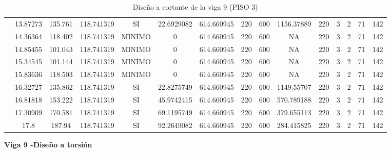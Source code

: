 \begin{table}[H]
{\begin{tabular}{|c|c|c|c|c|c|c|c|c|c|c|c|c|c|c|}
\cline{2-15}    & 13.87273 & 135.761 & 118.741319 & SI  & 22.6929082 & 614.660945 & 220 & 600 & 1156.37889 & 220 & 3   & 2   & 71  & 142 \bigstrut\\
\cline{2-15}    & 14.36364 & 118.402 & 118.741319 & MINIMO & 0   & 614.660945 & 220 & 600 & NA  & 220 & 3   & 2   & 71  & 142 \bigstrut\\
\cline{2-15}    & 14.85455 & 101.043 & 118.741319 & MINIMO & 0   & 614.660945 & 220 & 600 & NA  & 220 & 3   & 2   & 71  & 142 \bigstrut\\
\cline{2-15}    & 15.34545 & 101.144 & 118.741319 & MINIMO & 0   & 614.660945 & 220 & 600 & NA  & 220 & 3   & 2   & 71  & 142 \bigstrut\\
\cline{2-15}    & 15.83636 & 118.503 & 118.741319 & MINIMO & 0   & 614.660945 & 220 & 600 & NA  & 220 & 3   & 2   & 71  & 142 \bigstrut\\
\cline{2-15}    & 16.32727 & 135.862 & 118.741319 & SI  & 22.8275749 & 614.660945 & 220 & 600 & 1149.55707 & 220 & 3   & 2   & 71  & 142 \bigstrut\\
\cline{2-15}    & 16.81818 & 153.222 & 118.741319 & SI  & 45.9742415 & 614.660945 & 220 & 600 & 570.789188 & 220 & 3   & 2   & 71  & 142 \bigstrut\\
\cline{2-15}    & 17.30909 & 170.581 & 118.741319 & SI  & 69.1195749 & 614.660945 & 220 & 600 & 379.655113 & 220 & 3   & 2   & 71  & 142 \bigstrut\\
\cline{2-15}    & 17.8 & 187.94 & 118.741319 & SI  & 92.2649082 & 614.660945 & 220 & 600 & 284.415825 & 220 & 3   & 2   & 71  & 142 \bigstrut\\
\hline
\end{tabular}%



  

  }%
    \caption{Diseño a cortante de la viga 9 (PISO 3) }
  \label{tab:C VG9 P3 }%
\end{table}%
\newpage
\textbf{Viga 9 -Diseño a torsión}
